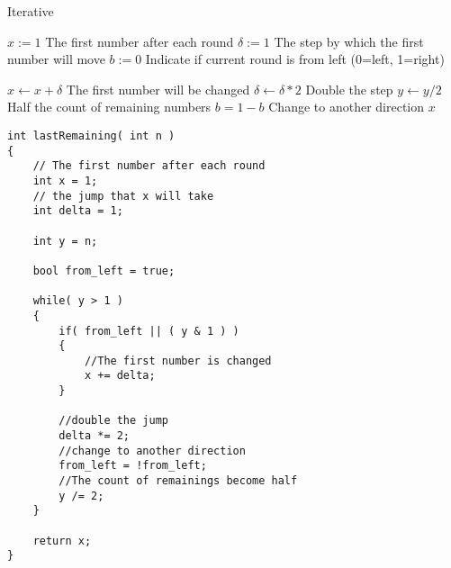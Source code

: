 \begin{algorithm}[H]
\caption{Iterative}
\begin{algorithmic}[1]
\State $x:=1$ \Comment The first number after each round
\State $\delta:=1$ \Comment The step by which the first number will move
\State $b:=0$ \Comment Indicate if current round is from left (0=left, 1=right)
\end{algorithmic}
\end{algorithm}
\begin{algorithm}[H]
\begin{algorithmic}[1]
\State $x\gets x+\delta$ \Comment The first number will be changed
\EndIf
\State $\delta\gets \delta * 2$ \Comment Double the step
\State $y\gets y/2$ \Comment Half the count of remaining numbers
\State $b=1-b$ \Comment Change to another direction
\EndWhile
\State \Return $x$
\EndProcedure
\end{algorithmic}
\end{algorithm}

\begin{lstlisting}[style=customc, caption={Iterative}]
int lastRemaining( int n )
{
    // The first number after each round
    int x = 1;
    // the jump that x will take
    int delta = 1;

    int y = n;

    bool from_left = true;

    while( y > 1 )
    {
        if( from_left || ( y & 1 ) )
        {
            //The first number is changed
            x += delta;
        }

        //double the jump
        delta *= 2;
        //change to another direction
        from_left = !from_left;
        //The count of remainings become half
        y /= 2;
    }

    return x;
}
\end{lstlisting}
